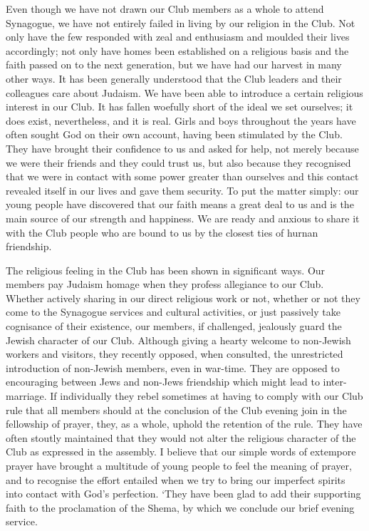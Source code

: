 Even though we have not drawn our Club members as
a whole to attend Synagogue, we have not entirely failed
in living by our religion in the Club. Not only have the
few responded with zeal and enthusiasm and moulded
their lives accordingly; not only have homes been established
on a religious basis and the faith passed on to the
next generation, but we have had our harvest in many
other ways. It has been generally understood that the
Club leaders and their colleagues care about Judaism.
We have been able to introduce a certain religious interest
in our Club. It has fallen woefully short of the ideal we
set ourselves; it does exist, nevertheless, and it is real.
Girls and boys throughout the years have often sought
God on their own account, having been stimulated by the
Club. They have brought their confidence to us and
asked for help, not merely because we were their friends
and they could trust us, but also because they recognised
that we were in contact with some power greater than
ourselves and this contact revealed itself in our lives and
gave them security. To put the matter simply: our
young people have discovered that our faith means a great
deal to us and is the main source of our strength and
happiness. We are ready and anxious to share it with
the Club people who are bound to us by the closest ties of
hurnan friendship.

The religious feeling in the Club has been shown in
significant ways. Our members pay Judaism homage
when they profess allegiance to our Club. Whether
actively sharing in our direct religious work or not,
whether or not they come to the Synagogue services and
cultural activities, or just passively take cognisance of
their existence, our members, if challenged, jealously
guard the Jewish character of our Club. Although giving
a hearty welcome to non-Jewish workers and visitors,
they recently opposed, when consulted, the unrestricted
introduction of non-Jewish members, even in war-time.
They are opposed to encouraging between Jews and
non-Jews friendship which might lead to inter-marriage.
If individually they rebel sometimes at having to
comply with our Club rule that all members should at
the conclusion of the Club evening join in the fellowship
of prayer, they, as a whole, uphold the retention of the
rule. They have often stoutly maintained that they
would not alter the religious character of the Club as
expressed in the assembly. I believe that our simple
words of extempore prayer have brought a multitude of
young people to feel the meaning of prayer, and to recognise
the effort entailed when we try to bring our imperfect
spirits into contact with God’s perfection. ‘They have
been glad to add their supporting faith to the proclamation
of the Shema, by which we conclude our brief evening
service.


